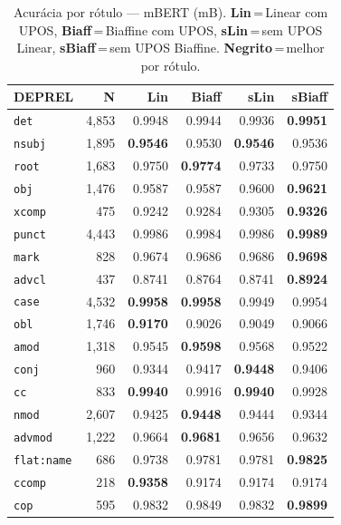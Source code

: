 \begin{table}[ht]
\centering\scriptsize
\setlength{\tabcolsep}{3pt}
\caption{Acurácia por rótulo --- mBERT (mB). \textbf{Lin}\,=\,Linear com UPOS, \textbf{Biaff}\,=\,Biaffine com UPOS, \textbf{sLin}\,=\,sem UPOS Linear, \textbf{sBiaff}\,=\,sem UPOS Biaffine. \textbf{Negrito}\,=\,melhor por rótulo.}
\label{tab:acc-mbert}
\begin{minipage}[t]{0.60\linewidth}
\centering
\begin{tabular}{l r  r r r r}
\toprule
\textbf{DEPREL} & \textbf{N} & \textbf{Lin} & \textbf{Biaff} & \textbf{sLin} & \textbf{sBiaff} \\
\midrule
\texttt{det} & 4,853 & 0.9948 & 0.9944 & 0.9936 & \textbf{0.9951} \\
\texttt{nsubj} & 1,895 & \textbf{0.9546} & 0.9530 & \textbf{0.9546} & 0.9536 \\
\texttt{root} & 1,683 & 0.9750 & \textbf{0.9774} & 0.9733 & 0.9750 \\
\texttt{obj} & 1,476 & 0.9587 & 0.9587 & 0.9600 & \textbf{0.9621} \\
\texttt{xcomp} & 475 & 0.9242 & 0.9284 & 0.9305 & \textbf{0.9326} \\
\texttt{punct} & 4,443 & 0.9986 & 0.9984 & 0.9986 & \textbf{0.9989} \\
\texttt{mark} & 828 & 0.9674 & 0.9686 & 0.9686 & \textbf{0.9698} \\
\texttt{advcl} & 437 & 0.8741 & 0.8764 & 0.8741 & \textbf{0.8924} \\
\texttt{case} & 4,532 & \textbf{0.9958} & \textbf{0.9958} & 0.9949 & 0.9954 \\
\texttt{obl} & 1,746 & \textbf{0.9170} & 0.9026 & 0.9049 & 0.9066 \\
\texttt{amod} & 1,318 & 0.9545 & \textbf{0.9598} & 0.9568 & 0.9522 \\
\texttt{conj} & 960 & 0.9344 & 0.9417 & \textbf{0.9448} & 0.9406 \\
\texttt{cc} & 833 & \textbf{0.9940} & 0.9916 & \textbf{0.9940} & 0.9928 \\
\texttt{nmod} & 2,607 & 0.9425 & \textbf{0.9448} & 0.9444 & 0.9344 \\
\texttt{advmod} & 1,222 & 0.9664 & \textbf{0.9681} & 0.9656 & 0.9632 \\
\texttt{flat\!:\!name} & 686 & 0.9738 & 0.9781 & 0.9781 & \textbf{0.9825} \\
\texttt{ccomp} & 218 & \textbf{0.9358} & 0.9174 & 0.9174 & 0.9174 \\
\texttt{cop} & 595 & 0.9832 & 0.9849 & 0.9832 & \textbf{0.9899} \\

\end{tabular}
\end{minipage}
\end{table}
